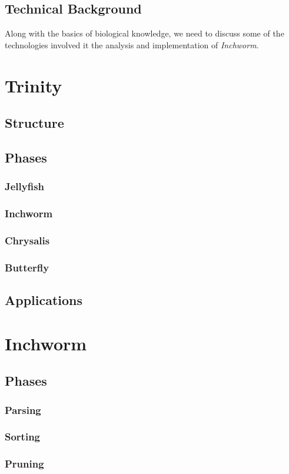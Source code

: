 \documentclass[plainarticle,zihtitle,english,final,hyperref,utf8]{zihpub}
\begin{document}
\subsection{Technical Background}
Along with the basics of biological knowledge, we need to discuss some of the technologies involved it the analysis and implementation of \emph{Inchworm}. 
\section{Trinity}
\subsection{Structure}
\subsection{Phases}
\subsubsection{Jellyfish}
\subsubsection{Inchworm}
\subsubsection{Chrysalis}
\subsubsection{Butterfly}
\subsection{Applications}

\section{Inchworm}
\subsection{Phases}
\subsubsection{Parsing}
\subsubsection{Sorting}
\subsubsection{Pruning}
\end{document}
